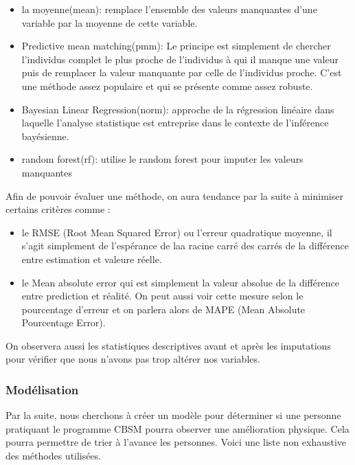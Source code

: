 \documentclass[]{article}
\providecommand{\tightlist}{%
  \setlength{\itemsep}{0pt}\setlength{\parskip}{0pt}}
\begin{document}
\begin{itemize}
\tightlist
\item
  la moyenne(mean): remplace l'ensemble des valeurs manquantes d'une
  variable par la moyenne de cette variable.
\item
  Predictive mean matching(pmm): Le principe est simplement de chercher
  l'individus complet le plus proche de l'individus à qui il manque une
  valeur puis de remplacer la valeur manquante par celle de l'individus
  proche. C'est une méthode assez populaire et qui se présente comme
  assez robuste.
\item
  Bayesian Linear Regression(norm): approche de la régression linéaire
  dans laquelle l'analyse statistique est entreprise dans le contexte de
  l'inférence bayésienne.
\item
  random forest(rf): utilise le random forest pour imputer les valeurs
  manquantes
\end{itemize}

Afin de pouvoir évaluer une méthode, on aura tendance par la suite à
minimiser certains critères comme :

\begin{itemize}
\tightlist
\item
  le RMSE (Root Mean Squared Error) ou l'erreur quadratique moyenne, il
  s'agit simplement de l'espérance de laa racine carré des carrés de la
  différence entre estimation et valeure réelle.
\item
  le Mean absolute error qui est simplement la valeur absolue de la
  différence entre prediction et réalité. On peut aussi voir cette
  mesure selon le pourcentage d'erreur et on parlera alors de MAPE (Mean
  Absolute Pourcentage Error).
\end{itemize}

On observera aussi les statistiques descriptives avant et après les
imputations pour vérifier que nous n'avons pas trop altérer nos
variables.

\hypertarget{modelisation}{%
\subsubsection{Modélisation}\label{modelisation}}

Par la suite, nous cherchons à créer un modèle pour déterminer si une
personne pratiquant le programme CBSM pourra observer une amélioration
physique. Cela pourra permettre de trier à l'avance les personnes. Voici
une liste non exhaustive des méthodes utilisées.
\end{document}
